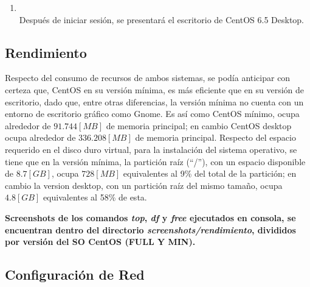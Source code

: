 \documentclass[11pt]{article}
\begin{document}
\begin{enumerate}
	        \item
	        	\begin{minipage}[t]{\linewidth}
			        \raggedright
			        \medskip
			        \\Después de iniciar sesión, se presentará el escritorio de CentOS 6.5 Desktop.
		        \end{minipage}
		    
		    \end{enumerate}

		    
\subsection{Rendimiento}
Respecto del consumo de recursos de ambos sistemas, se podía anticipar con certeza que, CentOS en su versión mínima, es más eficiente que en su versión de escritorio, dado que, entre otras diferencias, la versión mínima no cuenta con un entorno de escritorio gráfico como Gnome. Es así como CentOS mínimo, ocupa alrededor de $91.744 [MB]$ de memoria principal; en cambio CentOS desktop ocupa alrededor de $336.208 [MB]$ de memoria principal. Respecto del espacio requerido en el disco duro virtual, para la instalación del sistema operativo, se tiene que en la versión mínima, la partición raíz (``/''), con un espacio disponible de $8.7 [GB]$, ocupa $728 [MB]$ equivalentes al 9\% del total de la partición; en cambio la version desktop, con un partición raíz del mismo tamaño, ocupa $4.8 [GB]$ equivalentes al 58\% de esta.  

\textbf{Screenshots de los comandos \textit{top}, \textit{df} y \textit{free} ejecutados en consola, se encuentran dentro del directorio \textit{screenshots/rendimiento}, divididos por versión del SO CentOS (FULL Y MIN).}


\subsection{Configuración de Red}
\end{document}
